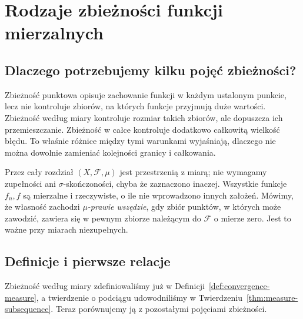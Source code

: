 \chapter{Rodzaje zbieżności funkcji mierzalnych}
\label{ch:rodzaje-zbieznosci}

\section{Dlaczego potrzebujemy kilku pojęć zbieżności?}

Zbieżność punktowa opisuje zachowanie funkcji w każdym ustalonym
punkcie, lecz nie kontroluje zbiorów, na których funkcje przyjmują
duże wartości. Zbieżność według miary kontroluje rozmiar takich
zbiorów, ale dopuszcza ich przemieszczanie. Zbieżność w całce
kontroluje dodatkowo całkowitą wielkość błędu. To właśnie różnice
między tymi warunkami wyjaśniają, dlaczego nie można dowolnie
zamieniać kolejności granicy i całkowania.

Przez cały rozdział $(X,\mathcal F,\mu)$ jest przestrzenią
z miarą; nie wymagamy zupełności ani $\sigma$-skończoności, chyba
że zaznaczono inaczej. Wszystkie funkcje $f_n,f$ są mierzalne i
rzeczywiste, o ile nie wprowadzono innych założeń. Mówimy, że
własność zachodzi \emph{$\mu$-prawie wszędzie}, gdy zbiór punktów,
w których może zawodzić, zawiera się w pewnym zbiorze należącym
do $\mathcal F$ o mierze zero. Jest to ważne przy miarach
niezupełnych.

\section{Definicje i pierwsze relacje}

Zbieżność według miary zdefiniowaliśmy już w
Definicji~\ref{def:convergence-measure}, a twierdzenie o podciągu
udowodniliśmy w Twierdzeniu~\ref{thm:measure-subsequence}.
Teraz porównujemy ją z pozostałymi pojęciami zbieżności.


